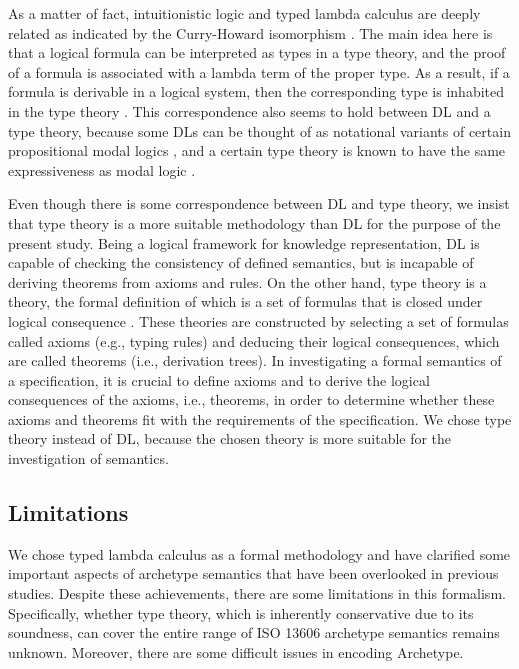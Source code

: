 \documentclass[preprint,3p,onecolumn,times,review]{article}
\begin{document}
{As a matter of fact, intuitionistic logic and typed lambda calculus are deeply related as indicated by the Curry-Howard isomorphism \cite{lawler08:_class_logic_curry_howar_corres,sorensen98:_lectur_curry_howar_isomor}.
The main idea here is that a logical formula can be interpreted as types in a type theory, and the proof of a formula is associated with a lambda term of the proper type. As a result, if a formula is derivable in a logical system, then the corresponding type is inhabited in the type theory \cite{asperti91:_categ_types_and_struc}.
This correspondence also seems to hold between DL and a type theory, because some DLs can be thought of as notational variants of certain propositional modal logics \cite[p.38]{baader07:_descr_logic_handb}\cite{rijke98:_modal_logic_descr_logic}, and a certain type theory is known to have the same expressiveness as modal logic \cite{nanevski05:_contex_model_type_theor}.

Even though there is some correspondence between DL and type theory, we insist that type theory is a more suitable methodology than DL for the purpose of the present study. Being a logical framework for knowledge representation, DL is capable of checking the consistency of defined semantics, but is incapable of deriving theorems from axioms and rules. On the other hand, type theory is a theory, the formal definition of which is a set of formulas that is closed under logical consequence \cite[p.32]{ben-ari12:_mathem_logic_comput_scien}. These theories are constructed by selecting a set of formulas called axioms (e.g., typing rules) and deducing their logical consequences, which are called theorems (i.e., derivation trees).
In investigating a formal semantics of a specification, it is crucial to define axioms and to derive the logical consequences of the axioms, i.e., theorems, in order to determine whether these axioms and theorems fit with the requirements of the specification.
We chose type theory instead of DL, because the chosen theory is more suitable for the investigation of semantics.

\subsection{Limitations}

We chose typed lambda calculus as a formal methodology and have clarified some important aspects of archetype semantics that have been overlooked in previous studies. Despite these achievements, there are some limitations in this formalism. Specifically, whether type theory, which is inherently conservative due to its soundness, can cover the entire range of ISO 13606 archetype semantics remains unknown. Moreover, there are some difficult issues in encoding Archetype.

}
\end{document}
